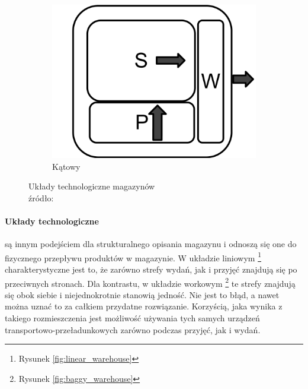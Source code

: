 \begin{figure}[h]
        	\quad
			\begin{subfigure}[b]{0.3\textwidth}
                \centering
                \includegraphics[width=\textwidth]{images/katowy_magazyn}
                \caption{Kątowy}
                \label{fig:angle_warehouse}
        	\end{subfigure}
        	\caption[Układy technologiczne magazynów]{
				Układy technologiczne magazynów\\
				źródło: \cite{PL_FM}        	
        	}
		\end{figure}
		\paragraph{Układy technologiczne} są innym podejściem dla strukturalnego opisania magazynu i odnoszą się
		one do fizycznego przepływu produktów w magazynie. W układzie liniowym \footnote{Rysunek \ref{fig:linear_warehouse}} 
		charakterystyczne jest to, że zarówno strefy wydań, jak i przyjęć znajdują się po przeciwnych stronach. Dla kontrastu,
		w układzie workowym \footnote{Rysunek \ref{fig:baggy_warehouse}} te strefy znajdują się obok siebie i niejednokrotnie
		stanowią jedność. Nie jest to błąd, a nawet można uznać to za całkiem przydatne rozwiązanie. Korzyścią, jaka 
		wynika z takiego rozmieszczenia jest możliwość używania tych samych urządzeń transportowo-przeładunkowych zarówno
		podczas przyjęć, jak i wydań. 
	
